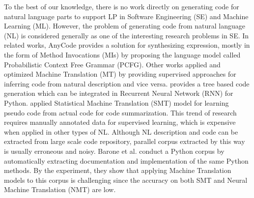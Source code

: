 To the best of our knowledge, there is no work directly on generating code for natural language parts to support LP in Software Engineering (SE) and Machine Learning (ML). However, the problem of generating code from natural language (NL) is considered generally as one of the interesting research problems in SE. In related works, AnyCode \cite{007} provides a solution for synthesizing expression, mostly in the form of Method Invocations (MIs) by proposing the language model called Probabilistic Context Free Grammar (PCFG). Other works applied and optimized Machine Translation (MT) by providing supervised approaches for inferring code from natural description and vice versa. \cite{008} provides a tree based code generation which can be integrated in Recurrent Neural Network (RNN) for Python. \cite{009} applied Statistical Machine Translation (SMT) model for learning pseudo code from actual code for code summarization. This trend of research requires manually annotated data for supervised learning, which is expensive when applied in other types of NL. Although NL description and code can be extracted from large scale code repository, parallel corpus extracted by this way is usually erroneous and noisy.  Barone  et al. \cite{010} conduct a Python corpus by automatically extracting documentation and implementation of the same Python methods. By the experiment, they show that applying Machine Translation models to this corpus is challenging since the accuracy on both SMT and Neural Machine Translation (NMT) are low.
